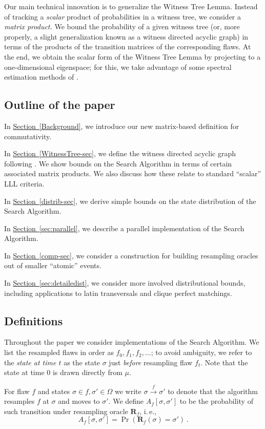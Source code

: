 \documentclass[11pt]{article}
\newcommand{\expref}[2]{\texorpdfstring{\hyperref[#2]{#1~\ref{#2}}}{#1~\ref{#2}}}
\newcommand{\ie}{i.\,e.}
\begin{document}
Our main technical innovation is to generalize the Witness Tree Lemma. Instead of
tracking a \emph{scalar} product of probabilities in a witness tree, we
%
consider a \emph{matrix product.}  We bound  the probability of a given witness tree (or, more properly, a slight generalization known as a witness directed acyclic graph) in terms of the products of the transition matrices of the corresponding flaws.  At the end, we obtain the scalar form of the Witness Tree Lemma by projecting to a one-dimensional eigenspace; for this, we take advantage of some spectral estimation methods of \cite{AIS}.

\subsection{Outline of the paper} 

%
In \expref{Section}{Background},  %
we introduce our new matrix-based definition for commutativity.

%

In \expref{Section}{WitnessTree-sec}, we define the witness directed acyclic graph following \cite{ParallelHarrisHaeupler}.  We show bounds on the Search Algorithm in terms of certain associated matrix products. We also discuss how these relate to standard ``scalar'' LLL criteria.

In \expref{Section}{distrib-sec}, we derive simple bounds on the state distribution  of the Search Algorithm.


In \expref{Section}{sec:parallel}, we describe a parallel implementation of the Search Algorithm.

In \expref{Section}{comp-sec}, we consider a construction for building resampling oracles out of smaller ``atomic'' events. 

In \expref{Section}{sec:detailedist}, we consider more involved distributional bounds, including applications to latin transversals and clique perfect matchings.

\subsection{Definitions}
Throughout the paper we consider implementations of the Search Algorithm. We list the resampled flaws in order as $f_0, f_1, f_2, \dots$; to avoid ambiguity, we refer to the \emph{state at time $t$} as the state $\sigma$ just \emph{before} resampling flaw $f_t$. Note that the state at time 0 is drawn directly from $\mu$.

For flaw $f$ and states $\sigma \in f, \sigma' \in \Omega$ we write $\sigma \xrightarrow{f} \sigma'$ to denote that the algorithm  resamples $f$ at $\sigma$ and moves to $\sigma'$.  We define $A_f[\sigma, \sigma']$ to be the probability of such transition under resampling oracle $\mathbf R_f$, \ie,
$$
A_f[\sigma, \sigma'] = \Pr( \mathbf R_f( \sigma) = \sigma') \,.
$$
\end{document}
